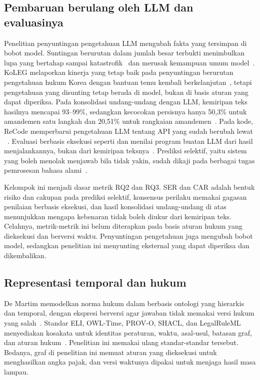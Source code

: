 \subsection{Pembaruan berulang oleh LLM dan evaluasinya}
\label{subsec:pembaruan-llm}

Penelitian penyuntingan pengetahuan LLM mengubah fakta yang tersimpan di bobot model. Suntingan berurutan dalam jumlah besar terbukti menimbulkan lupa yang bertahap sampai katastrofik~\cite{gupta2024forgetting} dan merusak kemampuan umum model~\cite{gu2024harms}. KoLEG melaporkan kinerja yang tetap baik pada penyuntingan berurutan pengetahuan hukum Korea dengan bantuan temu kembali berkelanjutan~\cite{seo2025koleg}, tetapi pengetahuan yang disunting tetap berada di model, bukan di basis aturan yang dapat diperiksa. Pada konsolidasi undang-undang dengan LLM, kemiripan teks hasilnya mencapai 93--99\%, sedangkan kecocokan persisnya hanya 50,3\% untuk amandemen satu langkah dan 20,51\% untuk rangkaian amandemen~\cite{prior2025risks}. Pada kode, ReCode memperbarui pengetahuan LLM tentang API yang sudah berubah lewat ~\cite{wu2026recode}. Evaluasi berbasis eksekusi seperti  dan  menilai program buatan LLM dari hasil menjalankannya, bukan dari kemiripan teksnya~\cite{chen2021evaluating,li2022alphacode}. Prediksi selektif, yaitu sistem yang boleh menolak menjawab bila tidak yakin, sudah dikaji pada berbagai tugas pemrosesan bahasa alami~\cite{varshney2022selective}.

Kelompok ini menjadi dasar metrik RQ2 dan RQ3. SER dan CAR adalah bentuk risiko dan cakupan pada prediksi selektif, konsensus perilaku memakai gagasan penilaian berbasis eksekusi, dan hasil konsolidasi undang-undang di atas menunjukkan mengapa kebenaran tidak boleh diukur dari kemiripan teks. Celahnya, metrik-metrik ini belum diterapkan pada basis aturan hukum yang dieksekusi dan berversi waktu. Penyuntingan pengetahuan juga mengubah bobot model, sedangkan penelitian ini menyunting  eksternal yang dapat diperiksa dan dikembalikan.

\subsection{Representasi temporal dan  hukum}
\label{subsec:kg-hukum}

De Martim memodelkan norma hukum dalam  berbasis ontologi yang hierarkis dan temporal, dengan ekspresi berversi agar jawaban tidak memakai versi hukum yang salah~\cite{demartim2025satgraph}. Standar ELI, OWL-Time, PROV-O, SHACL, dan LegalRuleML menyediakan kosakata untuk identitas peraturan, waktu, asal-usul, batasan graf, dan aturan hukum~\cite{publicationsoffice2026eli,cox2017owltime,lebo2013provo,knublauch2017shacl,palmirani2021legalruleml}. Penelitian ini memakai ulang standar-standar tersebut. Bedanya, graf di penelitian ini memuat aturan yang dieksekusi untuk menghasilkan angka pajak, dan versi waktunya dipakai untuk menjaga hasil masa lampau.

